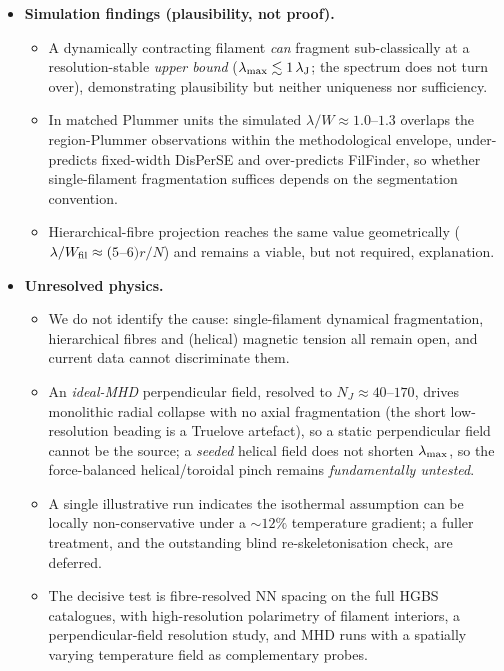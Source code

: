 \documentclass[usenatbib,twoside,twocolumn]{mnras}
\begin{document}
\begin{itemize}
    \item \textbf{Simulation findings (plausibility, not proof).}
    \begin{itemize}
        \item A dynamically contracting filament \emph{can} fragment sub-classically at a resolution-stable \emph{upper bound} ($\lambda_{\rm max}\lesssim1\,\lambda_{\rm J}$; the spectrum does not turn over), demonstrating plausibility but neither uniqueness nor sufficiency.
        \item In matched Plummer units the simulated $\lambda/W\approx1.0$--$1.3$ overlaps the region-Plummer observations within the methodological envelope, under-predicts fixed-width DisPerSE and over-predicts FilFinder, so whether single-filament fragmentation suffices depends on the segmentation convention.
        \item Hierarchical-fibre projection reaches the same value geometrically ($\lambda/W_{\rm fil}\approx(5$--$6)r/N$) and remains a viable, but not required, explanation.
    \end{itemize}

    \item \textbf{Unresolved physics.}
    \begin{itemize}
        \item We do not identify the cause: single-filament dynamical fragmentation, hierarchical fibres and (helical) magnetic tension all remain open, and current data cannot discriminate them.
        \item An \emph{ideal-MHD} perpendicular field, resolved to $N_J\approx40$--$170$, drives monolithic radial collapse with no axial fragmentation (the short low-resolution beading is a Truelove artefact), so a static perpendicular field cannot be the source; a \emph{seeded} helical field does not shorten $\lambda_{\rm max}$, so the force-balanced helical/toroidal pinch remains \emph{fundamentally untested}.
        \item A single illustrative run indicates the isothermal assumption can be locally non-conservative under a $\sim12\%$ temperature gradient; a fuller treatment, and the outstanding blind re-skeletonisation check, are deferred.
        \item The decisive test is fibre-resolved NN spacing on the full HGBS catalogues, with high-resolution polarimetry of filament interiors, a perpendicular-field resolution study, and MHD runs with a spatially varying temperature field as complementary probes.
    \end{itemize}
    \end{itemize}
\end{document}
